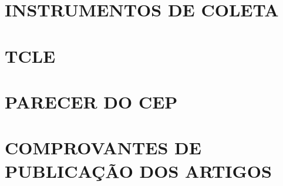 \documentclass[
    12pt,
    openright,
    twoside,
    a4paper,
    chapter=TITLE,
    sumario=tradicional,
    section=TITLE,
    english,
    brazil
]{abntex2}
\begin{document}
%
%
%
%

\postextual



\begin{apendicesenv}
\partapendices
\chapter{INSTRUMENTOS DE COLETA}
\chapter{TCLE}
\end{apendicesenv}

\begin{anexosenv}
\partanexos
\chapter{PARECER DO CEP}
\chapter{COMPROVANTES DE PUBLICAÇÃO DOS ARTIGOS}
\end{anexosenv}
\end{document}
